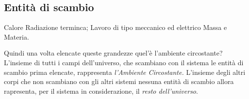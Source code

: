 \documentclass{book}
\begin{document}
\subsection{Entità di scambio}
\begin{tasks}
  \task Calore
  \task Radiazione terminca;
  \task Lavoro di tipo meccanico ed elettrico
  \task Massa e Materia.
\end{tasks}
Quindi una volta elencate queste grandezze quel'è l'ambiente circostante?\\
L'insieme di tutti i campi dell'universo, che scambiano con il sistema le entità
di scambio prima elencate, rappresenta {\it l'Ambiente Circostante.} L'insieme degli
altri corpi che non scambiano con gli altri sistemi nessuna entità di scambio allora
rapresenta, per il sistema in considerazione, il {\it resto dell'universo}.
\end{document}
